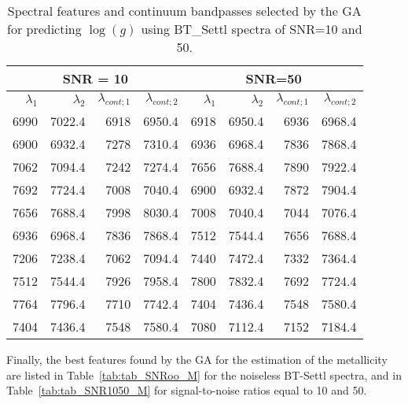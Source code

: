\begin{table*}
\begin{center}
\begin{tabular}{rrrr | rrrr}
  \hline
 \multicolumn{4}{c}{SNR = 10} &  \multicolumn{4}{c}{SNR=50} \\
  \hline
$\lambda_1$ & $\lambda_2$ & $\lambda_{cont;1}$ & $\lambda_{cont;2} $ & $\lambda_1$ & $\lambda_2$ & $\lambda_{cont;1}$ & $\lambda_{cont;2} $ \\ 
  \hline

6990 & 7022.4 &	6918 & 6950.4 & 6918 & 6950.4 & 6936 & 6968.4  \\
6900 & 6932.4 &	7278 & 7310.4 & 6936 & 6968.4 & 7836 & 7868.4  \\
7062 & 7094.4 &	7242 & 7274.4 & 7656 & 7688.4 & 7890 & 7922.4  \\
7692 & 7724.4 &	7008 & 7040.4 & 6900 & 6932.4 & 7872 & 7904.4  \\
7656 & 7688.4 &	7998 & 8030.4 & 7008 & 7040.4 & 7044 & 7076.4  \\
6936 & 6968.4 &	7836 & 7868.4 & 7512 & 7544.4 & 7656 & 7688.4  \\
7206 & 7238.4 &	7062 & 7094.4 & 7440 & 7472.4 & 7332 & 7364.4  \\
7512 & 7544.4 &	7926 & 7958.4 & 7800 & 7832.4 & 7692 & 7724.4  \\
7764 & 7796.4 &	7710 & 7742.4 & 7404 & 7436.4 & 7548 & 7580.4  \\
7404 & 7436.4 &	7548 & 7580.4 & 7080 & 7112.4 & 7152 & 7184.4  \\
   \hline
\end{tabular}
\caption {Spectral features and continuum bandpasses selected by the GA for predicting $\log(g)$ 
using BT\_Settl spectra of SNR=10 and 50.} \label{tab:tab_SNR1050_G}
\end{center}
\end{table*}


Finally, the best features found by the GA for the estimation of the
metallicity are listed in Table~\ref{tab:tab_SNRoo_M} for the
noiseless BT-Settl spectra, and in Table~\ref{tab:tab_SNR1050_M} for
signal-to-noise ratios equal to 10 and 50.

